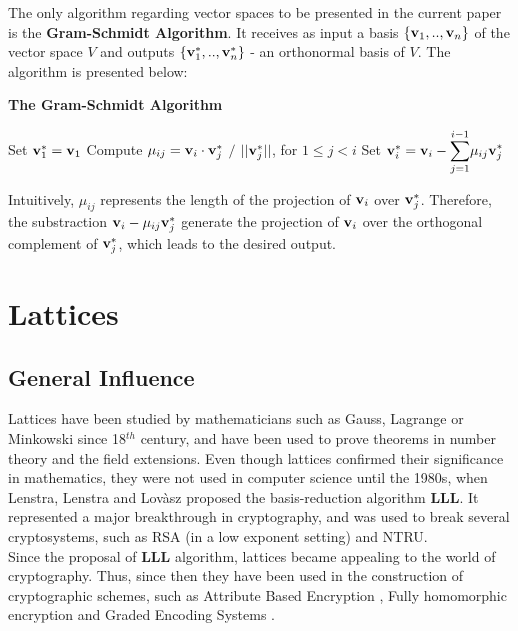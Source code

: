 \begin{enumerate}
	The only algorithm regarding vector spaces to be presented in the current paper is the  \textbf{Gram-Schmidt Algorithm}. It receives as input a basis $\{\textbf{v}_1, .., \textbf{v}_n\}$ of the vector space $V$ and outputs $\{\textbf{v}_1^*,..,\textbf{v}_n^*\}$ - an orthonormal basis of $V$. The algorithm is presented below:

\begin{tcolorbox}[colframe=black,colback=white,arc=0pt,outer arc=0pt]
	\begin{center}
		\textbf{The Gram-Schmidt Algorithm}
	\end{center}
	\begin{algorithmic}[1]
		\State Set $\textbf{v}_1^* = \textbf{v}_1$
		\State Compute $\mu_{ij} = \textbf{v}_i \cdot \textbf{v}_j^*$ $/$ $ ||\textbf{v}_j^*||$,  for $1 \leq j < i$
		\State Set $\textbf{v}_i^* = \textbf{v}_i - \displaystyle{\sum_{j = 1}^{i-1}} \mu_{ij} \textbf{v}_j^* $
		\EndFor
	\end{algorithmic}
\end{tcolorbox}

	Intuitively, $\mu_{ij}$ represents the length of the projection of $\textbf{v}_i$ over $\textbf{v}_j^*$. Therefore, the substraction $\textbf{v}_i - \mu_{ij} \textbf{v}_j^*$ generate the projection of $\textbf{v}_i$ over the orthogonal complement of $\textbf{v}_j^*$, which leads to the desired output. 
\end{enumerate}	

\section{Lattices}

\subsection{General Influence}

Lattices have been studied by mathematicians such as Gauss, Lagrange or Minkowski since 18$^{th}$ century, and have been used to prove theorems in number theory and the field extensions. Even though lattices confirmed their significance in mathematics, they were not used in computer science until the 1980s, when Lenstra, Lenstra and Lov\`{a}sz proposed the basis-reduction algorithm \textbf{LLL}. It represented a major breakthrough in cryptography, and was used to break several cryptosystems, such as RSA (in a low exponent setting) and NTRU. \\

Since the proposal of \textbf{LLL} algorithm, lattices became appealing to the world of cryptography. Thus, since then they have been used in the construction of cryptographic schemes, such as Attribute Based Encryption \cite{Boy13}, Fully homomorphic encryption \cite{Gen09} and Graded Encoding Systems \cite{GGH13}.

